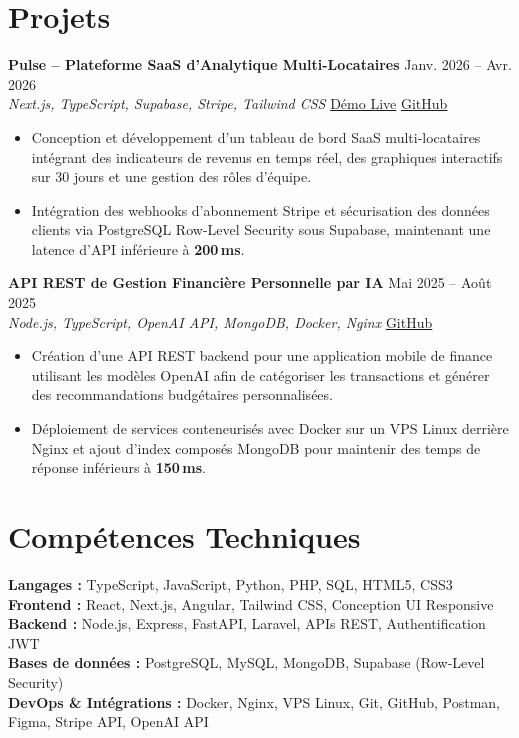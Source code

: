 \documentclass[10pt,a4paper]{article}
\newcommand{\entry}[4]{%
  {\bfseries #1} \hfill {\color{muted}#2}\\
  {\color{accent}\itshape #3} \hfill {\color{muted}\small #4}\par
  \vspace{1pt}}
\newcommand{\sep}{\hspace{4pt}{\color{muted}|}\hspace{4pt}}
\begin{document}
\section*{Projets}
\entry{Pulse -- Plateforme SaaS d'Analytique Multi-Locataires}{Janv. 2026 -- Avr. 2026}%
{Next.js, TypeScript, Supabase, Stripe, Tailwind CSS}%
{\href{https://pulse-dashboard-theta-swart.vercel.app/}{Démo Live}\sep
 \href{https://github.com/junnotdaniel13}{GitHub}}
\begin{itemize}
  \item Conception et développement d'un tableau de bord SaaS multi-locataires
        intégrant des indicateurs de revenus en temps réel, des graphiques
        interactifs sur 30 jours et une gestion des rôles d'équipe.
  \item Intégration des webhooks d'abonnement Stripe et sécurisation des
        données clients via PostgreSQL Row-Level Security sous Supabase,
        maintenant une latence d'API inférieure à \textbf{200\,ms}.
\end{itemize}
\vspace{5pt}

\entry{API REST de Gestion Financière Personnelle par IA}{Mai 2025 -- Août 2025}%
{Node.js, TypeScript, OpenAI API, MongoDB, Docker, Nginx}%
{\href{https://github.com/junnotdaniel13}{GitHub}}
\begin{itemize}
  \item Création d'une API REST backend pour une application mobile de finance
        utilisant les modèles OpenAI afin de catégoriser les transactions et
        générer des recommandations budgétaires personnalisées.
  \item Déploiement de services conteneurisés avec Docker sur un VPS Linux
        derrière Nginx et ajout d'index composés MongoDB pour maintenir des
        temps de réponse inférieurs à \textbf{150\,ms}.
\end{itemize}

\vfill

\section*{Compétences Techniques}
\textbf{Langages :} TypeScript, JavaScript, Python, PHP, SQL, HTML5, CSS3\\[2.5pt]
\textbf{Frontend :} React, Next.js, Angular, Tailwind CSS, Conception UI Responsive\\[2.5pt]
\textbf{Backend :} Node.js, Express, FastAPI, Laravel, APIs REST, Authentification JWT\\[2.5pt]
\textbf{Bases de données :} PostgreSQL, MySQL, MongoDB, Supabase (Row-Level Security)\\[2.5pt]
\textbf{DevOps \& Intégrations :} Docker, Nginx, VPS Linux, Git, GitHub, Postman, Figma, Stripe API, OpenAI API
\end{document}
